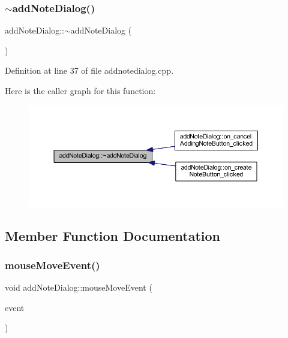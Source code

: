 \subsubsection{\texorpdfstring{$\sim$add\+Note\+Dialog()}{~addNoteDialog()}}
{\footnotesize\ttfamily add\+Note\+Dialog\+::$\sim$add\+Note\+Dialog (\begin{DoxyParamCaption}{ }\end{DoxyParamCaption})}



Definition at line 37 of file addnotedialog.\+cpp.

Here is the caller graph for this function\+:
\nopagebreak
\begin{figure}[H]
\begin{center}
\leavevmode
\includegraphics[width=350pt]{classaddNoteDialog_a900c8ab72a54252fa03299d821af644f_icgraph}
\end{center}
\end{figure}


\subsection{Member Function Documentation}
\hypertarget{classaddNoteDialog_a56670c6227c03bc1277f22789e7876e4}{}\label{classaddNoteDialog_a56670c6227c03bc1277f22789e7876e4} 
\subsubsection{\texorpdfstring{mouse\+Move\+Event()}{mouseMoveEvent()}}
{\footnotesize\ttfamily void add\+Note\+Dialog\+::mouse\+Move\+Event (\begin{DoxyParamCaption}\item[{Q\+Mouse\+Event $\ast$}]{event }\end{DoxyParamCaption})\hspace{0.3cm}{\ttfamily [private]}}




